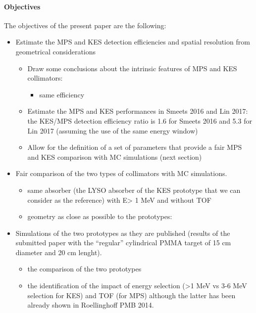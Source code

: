 \documentclass[a4paper,english]{article}
\begin{document}
\paragraph{Objectives}
The objectives of the present paper are the following:
\begin{itemize}
	\item Estimate the MPS and KES detection efficiencies and spatial resolution from geometrical considerations 
    \begin{itemize}
    	\item Draw some conclusions about the intrinsic features of MPS and KES collimators:  
        \begin{itemize}
        	\item same efficiency
        \end{itemize}
        \item Estimate the MPS and KES performances in Smeets 2016 and Lin 2017: the KES/MPS detection efficiency ratio is 1.6 for Smeets 2016 and 5.3 for Lin 2017 (assuming the use of the same energy window)
        \item Allow for the definition of a set of parameters that provide a fair MPS and KES comparison with MC simulations (next section)
    \end{itemize}
    \item Fair comparison of the two types of collimators with MC simulations. 
    \begin{itemize}
    	\item same absorber (the LYSO absorber of the KES prototype that we can consider as the reference) with E> 1 MeV and without TOF
        \item geometry as close as possible to the prototypes: 
	\end{itemize}            
    \item Simulations of the two prototypes as they are published (results of the submitted paper with the \enquote{regular} cylindrical PMMA target of 15 cm diameter and 20 cm lenght). 
    \begin{itemize}
		\item the comparison of the two prototypes
		\item the identification of the impact of energy selection (>1 MeV vs 3-6 MeV selection for KES) and TOF (for MPS) although the latter has been already shown in Roellinghoff PMB 2014.
	\end{itemize}        
\end{itemize}
\end{document}
